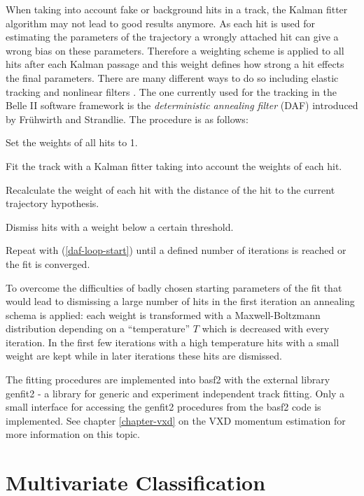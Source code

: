 When taking into account fake or background hits in a track, the Kalman fitter algorithm may not lead to good results anymore. As each hit is used for estimating the parameters of the trajectory a wrongly attached hit can give a wrong bias on these parameters. Therefore a weighting scheme is applied to all hits after each Kalman passage and this weight defines how strong a hit effects the final parameters. There are many different ways to do so including elastic tracking and nonlinear filters \cite{daf_fruh}. The one currently used for the tracking in the Belle II software framework is the \emph{deterministic annealing filter} (DAF) introduced by Frühwirth and Strandlie. The procedure is as follows:
\begin{zlist}
  \item Set the weights of all hits to 1.
  \item Fit the track with a Kalman fitter taking into account the weights of each hit. \label{daf-loop-start}
  \item Recalculate the weight of each hit with the distance of the hit to the current trajectory hypothesis.
  \item Dismiss hits with a weight below a certain threshold.
  \item Repeat with (\ref{daf-loop-start}) until a defined number of iterations is reached or the fit is converged.
\end{zlist}

To overcome the difficulties of badly chosen starting parameters of the fit that would lead to dismissing a large number of hits in the first iteration an annealing schema is applied: each weight is transformed with a Maxwell-Boltzmann distribution depending on a ``temperature'' $T$ which is decreased with every iteration. In the first few iterations with a high temperature hits with a small weight are kept while in later iterations these hits are dismissed.

The fitting procedures are implemented into basf2 with the external library genfit2 \cite{genfit} - a library for generic and experiment independent track fitting. Only a small interface for accessing the genfit2 procedures from the basf2 code is implemented. See chapter \ref{chapter-vxd} on the VXD momentum estimation for more information on this topic.

\section{Multivariate Classification}

